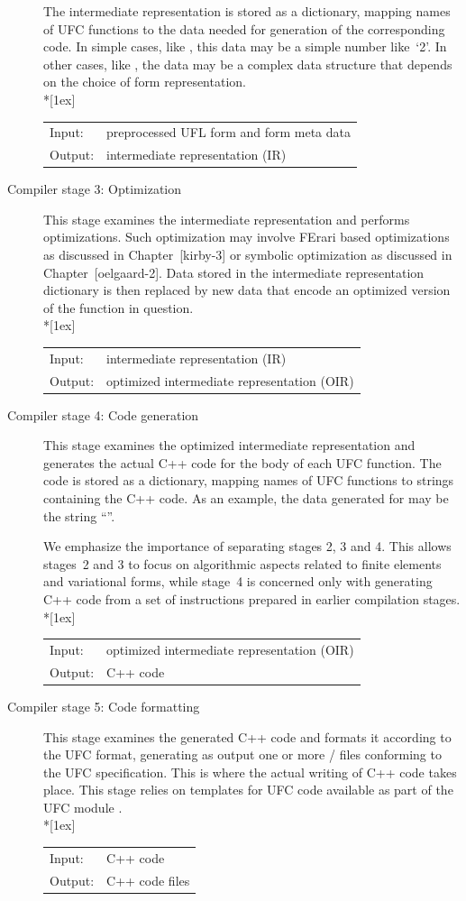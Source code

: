 \begin{description}
The intermediate representation is stored as a dictionary, mapping
names of UFC functions to the data needed for generation of the
corresponding code. In simple cases, like , this
data may be a simple number like~`2'. In other cases, like
, the data may be a complex
data structure that depends on the choice of form representation. \\*[1ex]
%
  \begin{tabular}{ll}
    Input:  & preprocessed UFL form and form meta data \\
    Output: & intermediate representation (IR)
  \end{tabular}
%
  \item[Compiler stage 3: Optimization]
This stage examines the intermediate representation and performs
optimizations. Such optimization may involve FErari based
optimizations as discussed in Chapter~[kirby-3] or symbolic
optimization as discussed in Chapter~[oelgaard-2].
Data stored in the
intermediate representation dictionary is then replaced by new data
that encode an optimized version of the function in question. \\*[1ex]
%
  \begin{tabular}{ll}
    Input:  & intermediate representation (IR) \\
    Output: & optimized intermediate representation (OIR)
  \end{tabular}
%
  \item[Compiler stage 4: Code generation]
This stage examines the optimized intermediate representation and
generates the actual C++ code for the body of each UFC function. The
code is stored as a dictionary, mapping names of UFC functions to
strings containing the C++ code. As an example, the data generated for
 may be the string ``''.

We emphasize the importance of separating stages 2, 3 and 4. This
allows stages~2 and 3 to focus on algorithmic aspects related to finite
elements and variational forms, while stage~4 is concerned only with
generating C++ code from a set of instructions prepared in earlier
compilation stages. \\*[1ex]
%
\begin{tabular}{ll}
  Input:  & optimized intermediate representation (OIR) \\
  Output: & C++ code
\end{tabular}
%
  \item[Compiler stage 5: Code formatting]
This stage examines the generated C++ code and formats it according to
the UFC format, generating as output one or more / files
conforming to the UFC specification. This is where the actual writing of C++
code takes place. This stage relies on templates for UFC code
available as part of the UFC module . \\*[1ex]
%
\begin{tabular}{ll}
  Input:  & C++ code \\
  Output: & C++ code files
\end{tabular}
\end{description}

